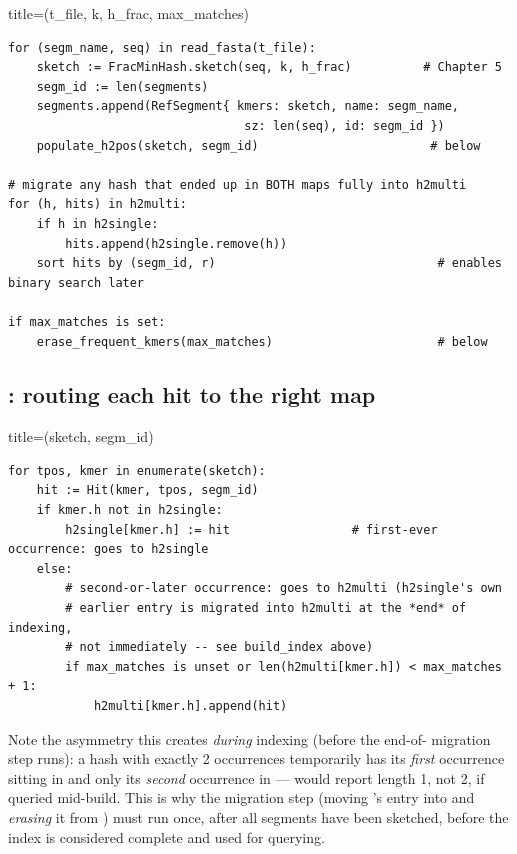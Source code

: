 \begin{algobox}{title={(t\_file, k, h\_frac, max\_matches)}}
\begin{verbatim}
for (segm_name, seq) in read_fasta(t_file):
    sketch := FracMinHash.sketch(seq, k, h_frac)          # Chapter 5
    segm_id := len(segments)
    segments.append(RefSegment{ kmers: sketch, name: segm_name,
                                 sz: len(seq), id: segm_id })
    populate_h2pos(sketch, segm_id)                        # below

# migrate any hash that ended up in BOTH maps fully into h2multi
for (h, hits) in h2multi:
    if h in h2single:
        hits.append(h2single.remove(h))
    sort hits by (segm_id, r)                               # enables binary search later

if max_matches is set:
    erase_frequent_kmers(max_matches)                       # below
\end{verbatim}
\end{algobox}

\subsection{: routing each hit to the right map}
\label{sec:index-populate}

\begin{algobox}{title={(sketch, segm\_id)}}
\begin{verbatim}
for tpos, kmer in enumerate(sketch):
    hit := Hit(kmer, tpos, segm_id)
    if kmer.h not in h2single:
        h2single[kmer.h] := hit                 # first-ever occurrence: goes to h2single
    else:
        # second-or-later occurrence: goes to h2multi (h2single's own
        # earlier entry is migrated into h2multi at the *end* of indexing,
        # not immediately -- see build_index above)
        if max_matches is unset or len(h2multi[kmer.h]) < max_matches + 1:
            h2multi[kmer.h].append(hit)
\end{verbatim}
\end{algobox}

\begin{notebox}
Note the asymmetry this creates \emph{during} indexing (before the end-of-
migration step runs): a hash with exactly 2 occurrences temporarily has its \emph{first}
occurrence sitting in  and only its \emph{second} occurrence in  ---
 would report length 1, not 2, if queried mid-build. This is why the migration
step (moving 's entry into  and \emph{erasing} it from
) must run once, after all segments have been sketched, before the index is
considered complete and used for querying.
\end{notebox}

